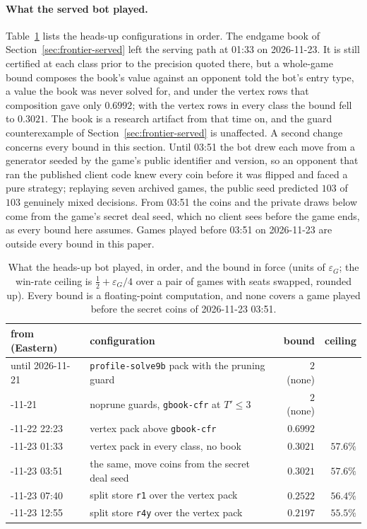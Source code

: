 \documentclass[11pt]{article}
\theoremstyle{plain}
\theoremstyle{definition}
\theoremstyle{remark}
\newcommand{\code}[1]{\texttt{\small #1}}
\newcommand{\game}{\ensuremath{G}}
\newcommand{\epsG}{\ensuremath{\varepsilon_{\game}}}
\begin{document}
\paragraph{What the served bot played.} Table~\ref{tab:servedhistory}
lists the heads-up configurations in order. The endgame book of
Section~\ref{sec:frontier-served} left the serving path at 01:33 on
2026-11-23. It is still certified at each class prior to the precision
quoted there, but a whole-game bound composes the book's value against
an opponent told the bot's entry type, a value the book was never
solved for, and under the vertex rows that composition gave only
$0.6992$; with the vertex rows in every class the bound fell to
$0.3021$. The book is a research artifact from that time on, and the
guard counterexample of Section~\ref{sec:frontier-served} is
unaffected. A second change concerns every bound in this section. Until
03:51 the bot drew each move from a generator seeded by the game's
public identifier and version, so an opponent that ran the published
client code knew every coin before it was flipped and faced a pure
strategy; replaying seven archived games, the public seed predicted
$103$ of $103$ genuinely mixed decisions. From 03:51 the coins and the
private draws below come from the game's secret deal seed, which no
client sees before the game ends, as every bound here assumes. Games
played before 03:51 on 2026-11-23 are outside every bound in this
paper.

\begin{table}[t]
\centering
\caption{What the heads-up bot played, in order, and the bound in
force (units of $\epsG$; the win-rate ceiling is
$\tfrac12+\epsG/4$ over a pair of games with seats swapped, rounded
up). Every bound is a floating-point computation, and none covers a
game played before the secret coins of 2026-11-23 03:51.}
\label{tab:servedhistory}
\small
\begin{tabular}{@{}>{\raggedright\arraybackslash}p{3.3cm}>{\raggedright\arraybackslash}p{6.0cm}rr@{}}
\toprule
from (Eastern) & configuration & bound & ceiling\\
\midrule
until 2026-11-21 & \code{profile-solve9b} pack with the pruning guard & $2$ (none) & \\
2026-11-21 & noprune guards, \code{gbook-cfr} at $T'\le3$ & $2$ (none) & \\
2026-11-22 22:23 & vertex pack above \code{gbook-cfr} & $0.6992$ & \\
2026-11-23 01:33 & vertex pack in every class, no book & $0.3021$ & $57.6\%$\\
2026-11-23 03:51 & the same, move coins from the secret deal seed & $0.3021$ & $57.6\%$\\
2026-11-23 07:40 & split store \code{r1} over the vertex pack & $0.2522$ & $56.4\%$\\
2026-11-23 12:55 & split store \code{r4y} over the vertex pack & $0.2197$ & $55.5\%$\\
\bottomrule
\end{tabular}
\end{table}
\end{document}

